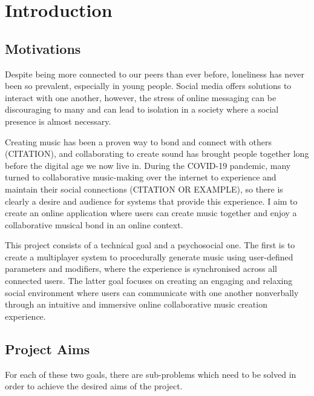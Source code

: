 \chapter{Introduction}



\section{Motivations}

Despite being more connected to our peers than ever before, loneliness has never been so prevalent, especially in young people. Social media offers solutions to interact with one another, however, the stress of online messaging can be discouraging to many and can lead to isolation in a society where a social presence is almost necessary.

Creating music has been a proven way to bond and connect with others (CITATION), and collaborating to create sound has brought people together long before the digital age we now live in. During the COVID-19 pandemic, many turned to collaborative music-making over the internet to experience and maintain their social connections (CITATION OR EXAMPLE), so there is clearly a desire and audience for systems that provide this experience. I aim to create an online application where users can create music together and enjoy a collaborative musical bond in an online context.

This project consists of a technical goal and a psychosocial one. The first is to create a multiplayer system to procedurally generate music using user-defined parameters and modifiers, where the experience is synchronised across all connected users. The latter goal focuses on creating an engaging and relaxing social environment where users can communicate with one another nonverbally through an intuitive and immersive online collaborative music creation experience.



\section{Project Aims}

For each of these two goals, there are sub-problems which need to be solved in order to achieve the desired aims of the project.

